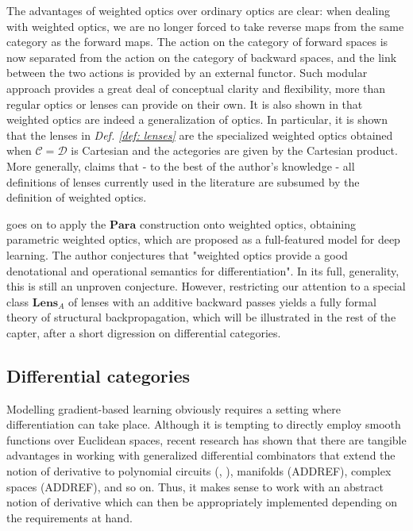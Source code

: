 \documentclass[11pt,a4paper,openright,twoside]{report}
\theoremstyle{plain}
\theoremstyle{definition}
\begin{document}
The advantages of weighted optics over ordinary optics are clear: when dealing with weighted optics, we are no longer forced to take reverse maps from the same category as the forward maps. The action on the category of forward spaces is now separated from the action on the category of backward spaces, and the link between the two actions is provided by an external functor. Such modular approach provides a great deal of conceptual clarity and flexibility, more than regular optics or lenses can provide on their own. It is also shown in \cite{gavranovic2024fundamental} that weighted optics are indeed a generalization of optics. In particular, it is shown that the lenses in \textit{Def. \ref{def: lenses}} are the specialized weighted optics obtained when $\mathcal{C} = \mathcal{D}$ is Cartesian and the actegories are given by the Cartesian product. More generally, \cite{gavranovic2024fundamental} claims that - to the best of the author's knowledge - all definitions of lenses currently used in the literature are subsumed by the definition of weighted optics.


\cite{gavranovic2024fundamental} goes on to apply the $\mathbf{Para}$ construction onto weighted optics, obtaining parametric weighted optics, which are proposed as a full-featured model for deep learning. The author conjectures that "weighted optics provide a good denotational and operational semantics for differentiation". In its full, generality, this is still an unproven conjecture. However, restricting our attention to a special class $\mathbf{Lens}_A$ of lenses with an additive backward passes yields a fully formal theory of structural backpropagation, which will be illustrated in the rest of the capter, after a short digression on differential categories.





\subsection{Differential categories}
\label{subsec: diffcats}


Modelling gradient-based learning obviously requires a setting where differentiation can take place. Although it is tempting to directly employ smooth functions over Euclidean spaces, recent research has shown that there are tangible advantages in working with generalized differential combinators that extend the notion of derivative to polynomial circuits (\cite{wilson2022categories}, \cite{wilson2021reverse}), manifolds (ADDREF), complex spaces (ADDREF), and so on.  Thus, it makes sense to work with an abstract notion of derivative which can then be appropriately implemented depending on the requirements at hand.
\end{document}
